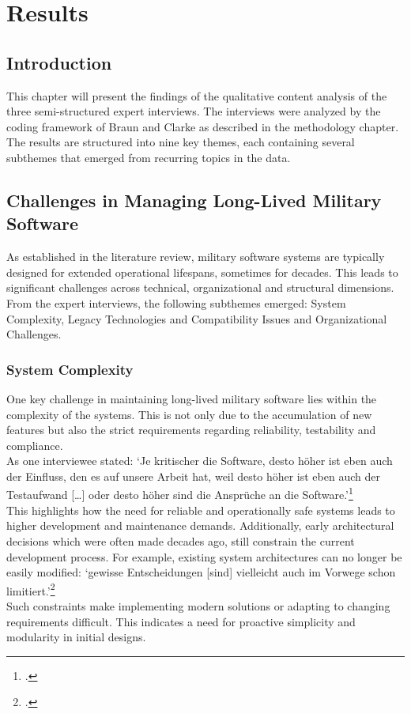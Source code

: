 \section{Results}
\subsection{Introduction}
This chapter will present the findings of the qualitative content analysis of the three semi-structured expert interviews. The interviews were analyzed by the coding framework of Braun and Clarke as described in the methodology chapter.
The results are structured into nine key themes, each containing several subthemes that emerged from recurring topics in the data.
\subsection{Challenges in Managing Long-Lived Military Software}
As established in the literature review, military software systems are typically designed for extended operational lifespans, sometimes for decades. This leads to significant challenges across technical, organizational and structural dimensions.
From the expert interviews, the following subthemes emerged: System Complexity, Legacy Technologies and Compatibility Issues and Organizational Challenges.

\subsubsection{System Complexity}
One key challenge in maintaining long-lived military software lies within the complexity of the systems. This is not only due to the accumulation of new features but also the strict requirements regarding reliability, testability and compliance.\\

As one interviewee stated: `Je kritischer die Software, desto höher ist eben auch der Einfluss, den es auf unsere Arbeit hat, weil desto höher ist eben auch der Testaufwand [\ldots] oder desto höher sind die Ansprüche an die Software.'\footcite{Interview22025}\\

This highlights how the need for reliable and operationally safe systems leads to higher development and maintenance demands. Additionally, early architectural decisions which were often made decades ago, 
still constrain the current development process. For example, existing system architectures can no longer be easily modified: `gewisse Entscheidungen [sind] vielleicht auch im Vorwege schon limitiert.'\footcite{Interview12025}\\
Such constraints make implementing modern solutions or adapting to changing requirements difficult. This indicates a need for proactive simplicity and modularity in initial designs.

